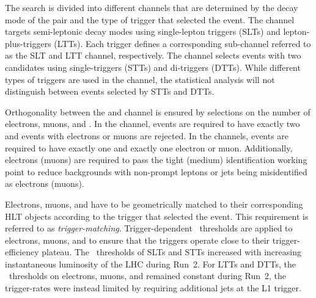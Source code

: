 The search is divided into different channels that are determined by the decay
mode of the \taulepton pair and the type of trigger that selected the event. The
\lephad channel targets semi-leptonic decay modes using single-lepton triggers
(SLTs) and lepton-plus-\tauhadvis triggers (LTTs). Each trigger defines a
corresponding sub-channel referred to as the \lephad SLT and \lephad LTT
channel, respectively. The \hadhad channel selects events with two \tauhadvis
candidates using single-\tauhadvis triggers (STTs) and di-\tauhadvis triggers
(DTTs). While different types of triggers are used in the \hadhad channel, the
statistical analysis will not distinguish between events selected by STTs and
DTTs.


Orthogonality between the \lephad and \hadhad channel is ensured by selections
on the number of electrons, muons, and \tauhadvis. In the \hadhad channel,
events are required to have exactly two \tauhadvis and events with electrons or
muons are rejected. In the \lephad channels, events are required to have exactly
one \tauhadvis and exactly one electron or muon. Additionally, electrons (muons)
are required to pass the tight (medium) identification working point to reduce
backgrounds with non-prompt leptons or jets being misidentified as electrons
(muons).

Electrons, muons, and \tauhadvis have to be geometrically matched to their
corresponding HLT objects according to the trigger that selected the event. This
requirement is referred to as \emph{trigger-matching}. Trigger-dependent
\pT~thresholds are applied to electrons, muons, and \tauhadvis to ensure that
the triggers operate close to their trigger-efficiency plateau. The
\pT~thresholds of SLTs and STTs increased with increasing instantaneous
luminosity of the LHC during Run~2. For LTTs and DTTs, the \pT~thresholds on
electrons, muons, and \tauhadvis remained constant during Run~2, the
trigger-rates were instead limited by requiring additional jets at the L1
trigger.


